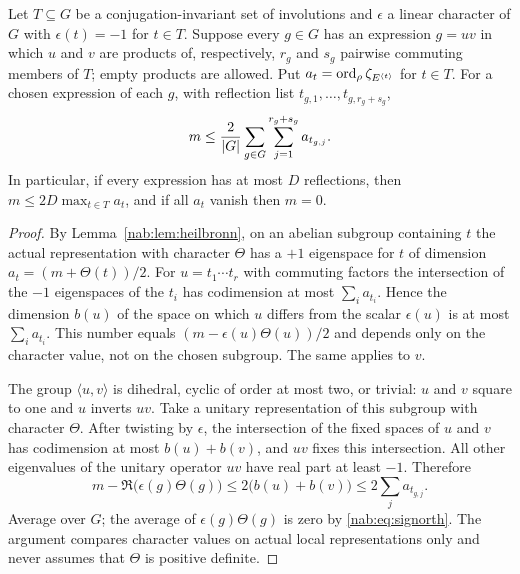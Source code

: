 \begin{theorem}\label{nab:thm:reflection}
Let $T\subseteq G$ be a conjugation-invariant set of involutions and $\epsilon$ a linear
character of $G$ with $\epsilon(t)=-1$ for $t\in T$. Suppose every $g\in G$ has an
expression $g=uv$ in which $u$ and $v$ are products of, respectively, $r_g$ and $s_g$
pairwise commuting members of $T$; empty products are allowed. Put
$a_t=\operatorname{ord}_\rho\zeta_{E^{\langle t\rangle}}$ for $t\in T$. For a chosen expression of each
$g$, with reflection list $t_{g,1},\dots,t_{g,r_g+s_g}$,
\begin{equation}\label{nab:eq:weighted}
 m\le\frac2{\lvert G\rvert}\sum_{g\in G}\sum_{j=1}^{r_g+s_g}a_{t_{g,j}} .
\end{equation}
In particular, if every expression has at most $D$ reflections, then
$m\le2D\max_{t\in T}a_t$, and if all $a_t$ vanish then $m=0$.
\end{theorem}
\begin{proof}
By Lemma~\ref{nab:lem:heilbronn}, on an abelian subgroup containing $t$ the actual
representation with character $\Theta$ has a $+1$ eigenspace for $t$ of dimension
$a_t=(m+\Theta(t))/2$. For $u=t_1\cdots t_r$ with commuting factors the intersection of the
$-1$ eigenspaces of the $t_i$ has codimension at most $\sum_ia_{t_i}$. Hence the dimension
$b(u)$ of the space on which $u$ differs from the scalar $\epsilon(u)$ is at most
$\sum_ia_{t_i}$. This number equals $(m-\epsilon(u)\Theta(u))/2$ and depends only on the
character value, not on the chosen subgroup. The same applies to $v$.

The group $\langle u,v\rangle$ is dihedral, cyclic of order at most two, or trivial: $u$
and $v$ square to one and $u$ inverts $uv$. Take a unitary representation of this
subgroup with character $\Theta$. After twisting by $\epsilon$, the intersection of the
fixed spaces of $u$ and $v$ has codimension at most $b(u)+b(v)$, and $uv$ fixes this
intersection. All other eigenvalues of the unitary operator $uv$ have real part at least
$-1$. Therefore
\[
 m-\Re\bigl(\epsilon(g)\Theta(g)\bigr)\le2\bigl(b(u)+b(v)\bigr)\le2\sum_ja_{t_{g,j}} .
\]
Average over $G$; the average of $\epsilon(g)\Theta(g)$ is zero by
\eqref{nab:eq:signorth}. The argument compares character values on actual local
representations only and never assumes that $\Theta$ is positive definite.
\end{proof}

